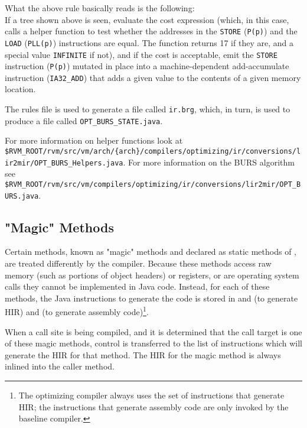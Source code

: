 What the above rule basically reads is the following:\\
If a tree shown above is seen, evaluate the cost expression (which, in this
case, calls a helper function to test whether the addresses in the
{\tt STORE} ({\tt P(p)}) and the {\tt LOAD} ({\tt PLL(p)}) instructions are
equal.  The function returns 17 if they are, and a special value
{\tt INFINITE} if not), and if the cost is acceptable, emit the {\tt STORE}
instruction ({\tt P(p)}) mutated in place into a machine-dependent
add-accumulate instruction ({\tt IA32\_ADD}) that adds a given value to the
contents of a given memory location.

The rules file is used to generate a file called {\tt ir.brg}, which, in
turn, is used to produce a file called {\tt OPT\_BURS\_STATE.java}.

For more information on helper functions look at
{\tt \$RVM\_ROOT/rvm/src/vm/arch/\{arch\}/compilers/optimizing/ir/conversions/lir2mir/OPT\_BURS\_Helpers.java}.
For more information on the BURS algorithm see
{\tt \$RVM\_ROOT/rvm/src/vm/compilers/optimizing/ir/conversions/lir2mir/OPT\_BURS.java}.

\JavaTMFooter

\PowerPCTMFooter

\subsection{"Magic" Methods}\label{magic}
Certain methods, known as "magic" methods and declared as static methods of 
, 
are treated differently by the compiler. Because these methods access
raw memory (such as portions of object headers) or registers, or are
operating system calls they cannot be implemented in Java\trademark
code. Instead, for each of these methods, the Java instructions to
generate the code is stored in 
 and 
 (to generate HIR) and 
(to generate assembly code)\footnote{The optimizing
compiler always uses the set of instructions that generate HIR; the
instructions that generate assembly code are only invoked by the
baseline compiler.}.

When a call site
is being compiled, and it is determined that the call target is one of these
magic methods, control is transferred to the list of instructions which will
generate the HIR for that method. The HIR for the magic method is always 
inlined into the caller method.

